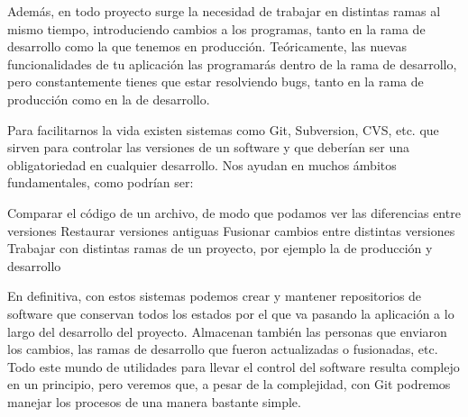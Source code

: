 \documentclass[12pt,spanish]{article}
\begin{document}
Además, en todo proyecto surge la necesidad de trabajar en distintas ramas al mismo tiempo, introduciendo cambios a los programas, tanto en la rama de desarrollo como la que tenemos en producción. Teóricamente, las nuevas funcionalidades de tu aplicación las programarás dentro de la rama de desarrollo, pero constantemente tienes que estar resolviendo bugs, tanto en la rama de producción como en la de desarrollo.

Para facilitarnos la vida existen sistemas como Git, Subversion, CVS, etc. que sirven para controlar las versiones de un software y que deberían ser una obligatoriedad en cualquier desarrollo. Nos ayudan en muchos ámbitos fundamentales, como podrían ser:

Comparar el código de un archivo, de modo que podamos ver las diferencias entre versiones 
Restaurar versiones antiguas 
Fusionar cambios entre distintas versiones 
Trabajar con distintas ramas de un proyecto, por ejemplo la de producción y desarrollo

En definitiva, con estos sistemas podemos crear y mantener repositorios de software que conservan todos los estados por el que va pasando la aplicación a lo largo del desarrollo del proyecto. Almacenan también las personas que enviaron los cambios, las ramas de desarrollo que fueron actualizadas o fusionadas, etc. Todo este mundo de utilidades para llevar el control del software resulta complejo en un principio, pero veremos que, a pesar de la complejidad, con Git podremos manejar los procesos de una manera bastante simple.
\end{document}
